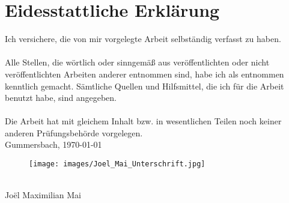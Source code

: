 \chapter*{Eidesstattliche Erklärung}

Ich versichere, die von mir vorgelegte Arbeit selbständig verfasst zu haben.\\ \\
Alle Stellen, die wörtlich oder sinngemäß aus veröffentlichten oder nicht veröffentlichten Arbeiten anderer entnommen sind, habe ich als entnommen kenntlich gemacht. Sämtliche Quellen und Hilfsmittel, die ich für die Arbeit benutzt habe, sind angegeben.\\ \\
Die Arbeit hat mit gleichem Inhalt bzw. in wesentlichen Teilen noch keiner anderen Prüfungsbehörde vorgelegen.
\vspace{1.5cm}
\\
Gummersbach, \today
\vspace{1cm}
\\
\begin{figure}[!ht]
		\texttt{[image: images/Joel\_Mai\_Unterschrift.jpg]}
\end{figure}
\\
Joël Maximilian Mai
